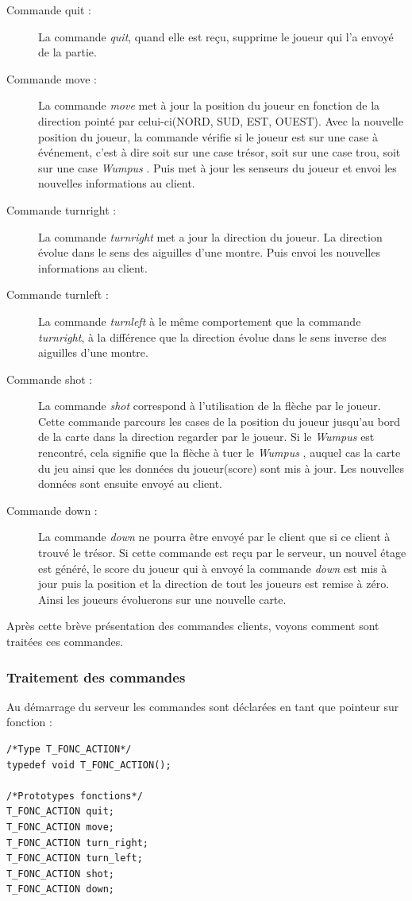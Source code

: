 \documentclass[a4paper,10pt]{article}
\newcommand{\gameName}{\emph{Wumpus }}
\begin{document}
	\begin{description}
		\item[Commande quit : ] La commande \emph{quit}, quand elle est reçu, supprime le joueur qui l'a envoyé de la partie.
		\item[Commande move : ] La commande \emph{move} met à jour la position du joueur en fonction de la direction pointé par celui-ci(NORD, SUD, EST, OUEST).
Avec la nouvelle position du joueur, la commande vérifie si le joueur est sur une case à événement, c'est à dire soit sur une case trésor, soit sur une case
trou, soit sur une case \gameName. Puis met à jour les senseurs du joueur et envoi les nouvelles informations au client.
		\item[Commande turnright : ] La commande \emph{turnright} met a jour la direction du joueur. La direction évolue dans le sens des aiguilles d'une
montre. Puis envoi les nouvelles informations au client.
		\item[Commande turnleft : ] La commande \emph{turnleft} à le même comportement que la commande \emph{turnright}, à la différence que la direction
évolue dans le sens inverse des aiguilles d'une montre.
		\item[Commande shot : ] La commande \emph{shot} correspond à l'utilisation de la flèche par le joueur. Cette commande parcours les cases de la position
du joueur jusqu'au bord de la carte dans la direction regarder par le joueur. Si le \gameName est rencontré, cela signifie que la flèche à tuer le \gameName,
auquel cas la carte du jeu ainsi que les données du joueur(score) sont mis à jour. Les nouvelles données sont ensuite envoyé au client.
		\item[Commande down : ] La commande \emph{down} ne pourra être envoyé par le client que si ce client à trouvé le trésor. Si cette commande est reçu par
le serveur, un nouvel étage est généré, le score du joueur qui à envoyé la commande \emph{down} est mis à jour puis la position et la direction de tout les
joueurs est remise à zéro. Ainsi les joueurs évoluerons sur une nouvelle carte.
	\end{description}

	Après cette brève présentation des commandes clients, voyons comment sont traitées ces commandes.
	\subsubsection{Traitement des commandes}
	\label{subsubTraitCommandes}

	Au démarrage du serveur les commandes sont déclarées en tant que pointeur sur fonction :
	\begin{lstlisting}
/*Type T_FONC_ACTION*/
typedef void T_FONC_ACTION();

/*Prototypes fonctions*/
T_FONC_ACTION quit;
T_FONC_ACTION move;
T_FONC_ACTION turn_right;
T_FONC_ACTION turn_left;
T_FONC_ACTION shot;
T_FONC_ACTION down;

	\end{lstlisting}
\end{document}
